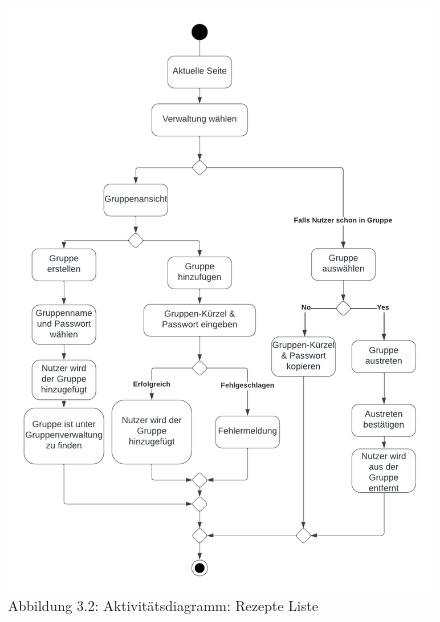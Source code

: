 \documentclass[parskip=full]{scrartcl}
\begin{document}
\begin{figure}[!htp]
    \centering
    \includegraphics{images/section3/Aktivitaetsdiagramm Gruppenverwaltung.png}\\
    Abbildung 3.2: Aktivitätsdiagramm: Rezepte Liste
    \label{fig:A32}
\end{figure}
\newpage
\end{document}
